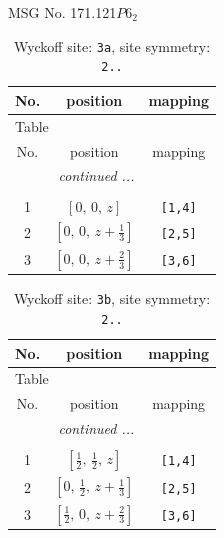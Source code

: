 \documentclass[fleqn,8pt]{jsarticle}
\begin{document}
\setcounter{MaxMatrixCols}{32}

\renewcommand{\tablename}{Table~}
\renewcommand{\figurename}{Figure~}
\begin{center}
\LARGE
MSG No. 171.121\quad$P6_{2}$
\end{center}
\renewcommand{\arraystretch}{1.2}
\begin{longtable}{ccc}
\caption{Wyckoff site: {\tt 3a}, site symmetry: {\tt 2..}}
 \\
 \hline \hline
No. & position & mapping \\ \hline \endfirsthead

\multicolumn{2}{l}{\tablename\ \thetable{}} \\
 \hline \hline
No. & position & mapping \\ \hline \endhead

 \hline \hline
\multicolumn{2}{r}{\footnotesize\it continued ...} \\ \endfoot

 \hline \hline
\multicolumn{2}{r}{} \\ \endlastfoot

1 & $\left[ 0,\, 0,\, z \right]$ & {\tt [1,4]} \\ \hline
2 & $\left[ 0,\, 0,\, z + \frac{1}{3} \right]$ & {\tt [2,5]} \\ \hline
3 & $\left[ 0,\, 0,\, z + \frac{2}{3} \right]$ & {\tt [3,6]} \\
\end{longtable}
\renewcommand{\arraystretch}{1.2}
\begin{longtable}{ccc}
\caption{Wyckoff site: {\tt 3b}, site symmetry: {\tt 2..}}
 \\
 \hline \hline
No. & position & mapping \\ \hline \endfirsthead

\multicolumn{2}{l}{\tablename\ \thetable{}} \\
 \hline \hline
No. & position & mapping \\ \hline \endhead

 \hline \hline
\multicolumn{2}{r}{\footnotesize\it continued ...} \\ \endfoot

 \hline \hline
\multicolumn{2}{r}{} \\ \endlastfoot

1 & $\left[ \frac{1}{2},\, \frac{1}{2},\, z \right]$ & {\tt [1,4]} \\ \hline
2 & $\left[ 0,\, \frac{1}{2},\, z + \frac{1}{3} \right]$ & {\tt [2,5]} \\ \hline
3 & $\left[ \frac{1}{2},\, 0,\, z + \frac{2}{3} \right]$ & {\tt [3,6]} \\
\end{longtable}
\end{document}
